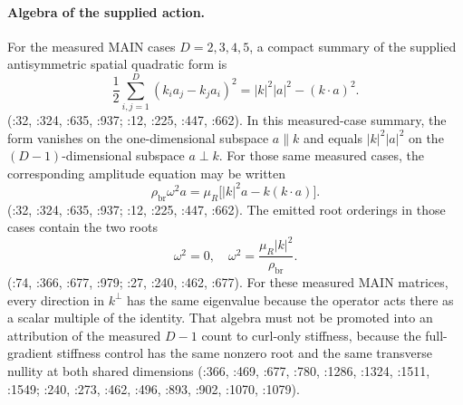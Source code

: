 \paragraph{Algebra of the supplied action.}
For the measured MAIN cases \(D=2,3,4,5\), a compact summary of the supplied
antisymmetric spatial quadratic form is
\[
 \frac12\sum_{i,j=1}^{D}(k_i a_j-k_j a_i)^2
   =|k|^2|a|^2-(k\mathbin{\cdot}a)^2.
\]
(:32,
:324, :635, :937;
:12,
:225, :447, :662).
In this measured-case summary, the form vanishes on the one-dimensional
subspace \(a\parallel k\) and equals \(|k|^2|a|^2\) on the
\((D-1)\)-dimensional subspace \(a\perp k\).
For those same measured cases, the corresponding amplitude equation may be
written
\[
 \rho_{\mathrm{br}}\omega^2a
 =\mu_R\bigl[|k|^2a-k(k\mathbin{\cdot}a)\bigr].
\]
(:32,
:324, :635, :937;
:12,
:225, :447, :662).
The emitted root orderings in those cases contain the two roots
\[
 \omega^2=0,
 \quad
 \omega^2=\frac{\mu_R|k|^2}{\rho_{\mathrm{br}}}.
\]
(:74,
:366, :677, :979;
:27,
:240, :462, :677).
For these measured MAIN matrices, every direction in \(k^\perp\) has the same
eigenvalue because the operator acts there as a scalar multiple of the identity.
That algebra must not be promoted into an attribution of the measured
\(D-1\) count to curl-only stiffness, because the full-gradient stiffness
control has the same nonzero root and the same transverse nullity at both
shared dimensions (:366,
:469, :677, :780, :1286, :1324, :1511, :1549;
:240,
:273, :462, :496, :893, :902, :1070, :1079).

